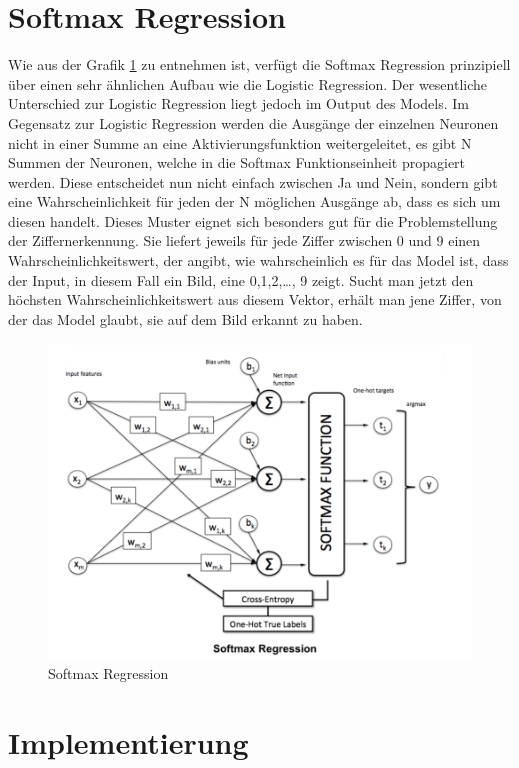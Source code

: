 \section{Softmax Regression}
Wie aus der Grafik \ref{fig:softmax_regression} zu entnehmen ist, verfügt die Softmax Regression prinzipiell über einen sehr ähnlichen Aufbau wie die Logistic Regression. Der wesentliche Unterschied zur Logistic Regression liegt jedoch im Output des Models. Im Gegensatz zur Logistic Regression werden die Ausgänge der einzelnen Neuronen nicht in einer Summe an eine Aktivierungsfunktion weitergeleitet, es gibt N Summen der Neuronen, welche in die Softmax Funktionseinheit propagiert werden. Diese entscheidet nun nicht einfach zwischen Ja und Nein, sondern gibt eine Wahrscheinlichkeit für jeden der N möglichen Ausgänge ab, dass es sich um diesen handelt. Dieses Muster eignet sich besonders gut für die Problemstellung der Ziffernerkennung. Sie liefert jeweils für jede Ziffer zwischen 0 und 9 einen Wahrscheinlichkeitswert, der angibt, wie wahrscheinlich es für das Model ist, dass der Input, in diesem Fall ein Bild, eine 0,1,2,…, 9 zeigt. Sucht man jetzt den höchsten Wahrscheinlichkeitswert aus diesem Vektor, erhält man jene Ziffer, von der das Model glaubt, sie auf dem Bild erkannt zu haben.
\begin{figure}[!ht]
\centering
\includegraphics[width=1.00\textwidth]{images/softmax}
\caption{Softmax Regression}
\label{fig:softmax_regression}
\end{figure}

\section{Implementierung}

